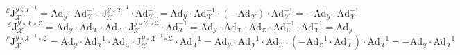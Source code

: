 \documentclass[12pt, onecolumn]{article}
\newcommand\bsm[1]{\boldsymbol{\mathrm{#1}}}
\begin{document}
	\begin{equation}
	^\mathcal{E}\bsm{J}_{\mathcal{X}}^{\mathcal{Y}\circ\mathcal{X}^{-1}}
	=\bsm{Ad}_{\mathcal{Y}}\cdot\bsm{Ad}_{\mathcal{X}}^{-1}\cdot
	\bsm{J}_{\mathcal{X}}^{\mathcal{Y}\circ\mathcal{X}^{-1}}\cdot
	\bsm{Ad}_{\mathcal{X}}^{-1}
	=\bsm{Ad}_{\mathcal{Y}}\cdot\bsm{Ad}_{\mathcal{X}}^{-1}\cdot
		\left( -\bsm{Ad}_{\mathcal{X}}\right) \cdot
		\bsm{Ad}_{\mathcal{X}}^{-1}=-\bsm{Ad}_{\mathcal{Y}}\cdot\bsm{Ad}_{\mathcal{X}}^{-1}
	\end{equation}
	\begin{equation}
	^\mathcal{E}\bsm{J}_{\mathcal{X}}^{\mathcal{Y}\circ\mathcal{X}\circ\mathcal{Z}}
	=\bsm{Ad}_{\mathcal{Y}}\cdot\bsm{Ad}_{\mathcal{X}}\cdot\bsm{Ad}_{\mathcal{Z}}\cdot
	\bsm{J}_{\mathcal{X}}^{\mathcal{Y}\circ\mathcal{X}\circ\mathcal{Z}}\cdot
	\bsm{Ad}_{\mathcal{X}}^{-1}
	=\bsm{Ad}_{\mathcal{Y}}\cdot\bsm{Ad}_{\mathcal{X}}\cdot\bsm{Ad}_{\mathcal{Z}}\cdot
		\bsm{Ad}_{\mathcal{Z}}^{-1}\cdot
		\bsm{Ad}_{\mathcal{X}}^{-1}
		=\bsm{Ad}_{\mathcal{Y}}
	\end{equation}
	\begin{equation}
	^\mathcal{E}\bsm{J}_{\mathcal{X}}^{\mathcal{Y}\circ\mathcal{X}^{-1}\circ\mathcal{Z}}
	=\bsm{Ad}_{\mathcal{Y}}\cdot\bsm{Ad}_{\mathcal{X}}^{-1}\cdot\bsm{Ad}_{\mathcal{Z}}\cdot\bsm{J}_{\mathcal{X}}^{\mathcal{Y}\circ\mathcal{X}^{-1}\circ\mathcal{Z}}\cdot
	\bsm{Ad}_{\mathcal{X}}^{-1}
	=\bsm{Ad}_{\mathcal{Y}}\cdot\bsm{Ad}_{\mathcal{X}}^{-1}\cdot\bsm{Ad}_{\mathcal{Z}}\cdot\left( 
	-\bsm{Ad}_{\mathcal{Z}}^{-1}\cdot\bsm{Ad}_{\mathcal{X}}\right) \cdot
		\bsm{Ad}_{\mathcal{X}}^{-1}
		=-\bsm{Ad}_{\mathcal{Y}}\cdot\bsm{Ad}_{\mathcal{X}}^{-1}
	\end{equation}
	
\end{document}

